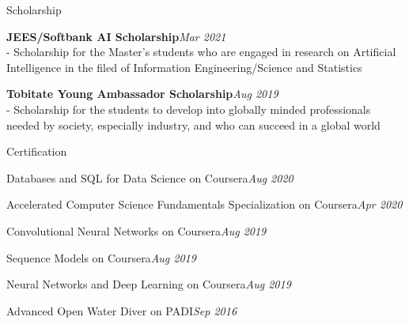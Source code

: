 \documentclass{resume} %
\begin{document}
\begin{rSection}{Scholarship}
 \item {\bf JEES/Softbank AI Scholarship}\hfill {\em Mar 2021}\\- Scholarship for the Master's students who are engaged in research on Artificial Intelligence in the filed of Information Engineering/Science and Statistics

 \item {\bf Tobitate Young Ambassador Scholarship}\hfill {\em Aug 2019}\\- Scholarship for the students to develop into globally minded professionals needed by society, especially industry, and who can succeed in a global world

\end{rSection}

\begin{rSection}{Certification}
 \item Databases and SQL for Data Science on Coursera\hfill {\em Aug 2020}
\item Accelerated Computer Science Fundamentals Specialization on Coursera\hfill {\em Apr 2020}
\item Convolutional Neural Networks on Coursera\hfill {\em Aug 2019}
\item Sequence Models on Coursera\hfill {\em Aug 2019}
\item Neural Networks and Deep Learning on Coursera\hfill{\em Aug 2019}
\item Advanced Open Water Diver on PADI\hfill{\em Sep 2016}
\end{rSection}
\end{document}
